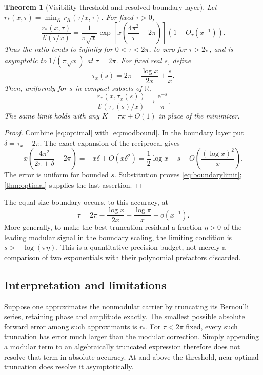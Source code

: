 \documentclass[11pt,a4paper]{article}
\newtheorem{theorem}{Theorem}[section]
\theoremstyle{definition}
\theoremstyle{remark}
\newcommand{\e}{\mathrm e}
\newcommand{\R}{\mathbb R}
\newcommand{\Ecal}{\mathcal E}
\begin{document}
\begin{theorem}[Visibility threshold and resolved boundary layer]
\label{thm:visibility}
Let $r_*(x,\tau)=\min_K r_K(\tau/x,\tau)$. For fixed $\tau>0$,
\begin{equation}
 \frac{r_*(x,\tau)}{\Ecal(\tau/x)}
 =\frac1{\pi\sqrt{x}}
  \exp\!\left[x\left(\frac{4\pi^2}{\tau}-2\pi\right)\right]
  \left(1+O_\tau(x^{-1})\right).
 \label{eq:ratio}
\end{equation}
Thus the ratio tends to infinity for $0<\tau<2\pi$, to zero for
$\tau>2\pi$, and is asymptotic to $1/(\pi\sqrt{x})$ at $\tau=2\pi$.
For fixed real $s$, define
\begin{equation}
 \tau_x(s)=2\pi-\frac{\log x}{2x}+\frac{s}{x}.
 \label{eq:boundary}
\end{equation}
Then, uniformly for $s$ in compact subsets of $\R$,
\begin{equation}
 \boxed{\displaystyle
 \frac{r_*(x,\tau_x(s))}{\Ecal(\tau_x(s)/x)}
 \longrightarrow \frac{\e^{-s}}\pi.}
 \label{eq:boundarylimit}
\end{equation}
The same limit holds with any $K=\pi x+O(1)$ in place of the minimizer.
\end{theorem}
\begin{proof}
Combine \eqref{eq:optimal} with \eqref{eq:modbound}. In the boundary layer
put $\delta=\tau_x-2\pi$. The exact expansion of the reciprocal gives
\[
 x\left(\frac{4\pi^2}{2\pi+\delta}-2\pi\right)
 =-x\delta+O(x\delta^2)
 =\frac12\log x-s+O\!\left(\frac{(\log x)^2}{x}\right).
\]
The error is uniform for bounded $s$. Substitution proves
\eqref{eq:boundarylimit}; \cref{thm:optimal} supplies the last assertion.
\end{proof}

The equal-size boundary occurs, to this accuracy, at
\begin{equation}
 \tau=2\pi-\frac{\log x}{2x}-\frac{\log\pi}{x}+o(x^{-1}).
 \label{eq:equalboundary}
\end{equation}
More generally, to make the best truncation residual a fraction $\eta>0$
of the leading modular signal in the boundary scaling, the limiting
condition is $s>-\log(\pi\eta)$. This is a quantitative precision budget,
not merely a comparison of two exponentials with their polynomial
prefactors discarded.

\subsection{Interpretation and limitations}
Suppose one approximates the nonmodular carrier by truncating its Bernoulli
series, retaining phase and amplitude exactly. The smallest possible
absolute forward error among such approximants is $r_*$. For
$\tau<2\pi$ fixed, every such truncation has error much larger than the
modular correction. Simply appending a modular term to an algebraically
truncated expression therefore does not resolve that term in absolute
accuracy. At and above the threshold, near-optimal truncation does resolve
it asymptotically.
\end{document}
